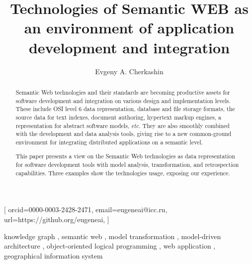 \documentclass[
]{ceurart}
\begin{document}


\title{Technologies of Semantic WEB as an environment of application development and integration}
\author[1,2]{Evgeny A. Cherkashin}[%
orcid=0000-0003-2428-2471,
email=eugeneai@icc.ru,
url=https://github.org/eugeneai,
]
\address[1]{Matrosov Institute for System Dynamics and Control Theory of Siberian Branch of Russian Academy of Sciences, 134 Lermontov St, Irkutsk, 664033, Russian Federation}

\address[2]{Institute for Mathematics and Information Technologies, Irkutsk State University, 20~Gagarina Bulv, Irkutsk, 664003, Russian Federation}

\begin{abstract}
  Semantic Web technologies and their standards are becoming productive assets for software development and integration on various design and implementation levels.  These include OSI level 6 data representation, database and file storage formats, the source data for text indexes, document authoring, hypertext markup engines, a representation for abstract software models, \emph{etc.}  They are also smoothly combined with the development and data analysis tools, giving rise to a new common-ground environment for integrating distributed applications on a semantic level.

  This paper presents a view on the Semantic Web technologies as data representation for software development tools with model analysis, transformation, and retrospection capabilities.  Three examples show the technologies usage, exposing our experience.
\end{abstract}

\begin{keywords}
  knowledge graph \sep
  semantic web \sep
  model transformation \sep
  model-driven architecture \sep
  object-oriented logical programming \sep
  web application \sep
  geographical information system
\end{keywords}
\end{document}
